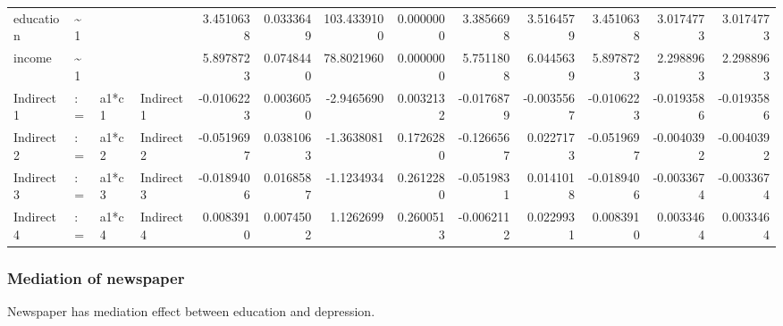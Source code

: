 \documentclass[
]{article}
\begin{document}
\begin{table}[!h]
\begin{tabular}[t]{llllrrrrrrrrr}
\addlinespace
education & \textasciitilde{}1 &  &  & 3.4510638 & 0.0333649 & 103.4339100 & 0.0000000 & 3.3856698 & 3.5164579 & 3.4510638 & 3.0174773 & 3.0174773\\
income & \textasciitilde{}1 &  &  & 5.8978723 & 0.0748440 & 78.8021960 & 0.0000000 & 5.7511808 & 6.0445639 & 5.8978723 & 2.2988963 & 2.2988963\\
Indirect1 & := & a1*c1 & Indirect1 & -0.0106223 & 0.0036050 & -2.9465690 & 0.0032132 & -0.0176879 & -0.0035567 & -0.0106223 & -0.0193586 & -0.0193586\\
Indirect2 & := & a1*c2 & Indirect2 & -0.0519697 & 0.0381063 & -1.3638081 & 0.1726280 & -0.1266567 & 0.0227173 & -0.0519697 & -0.0040392 & -0.0040392\\
Indirect3 & := & a1*c3 & Indirect3 & -0.0189406 & 0.0168587 & -1.1234934 & 0.2612280 & -0.0519831 & 0.0141018 & -0.0189406 & -0.0033674 & -0.0033674\\
\addlinespace
Indirect4 & := & a1*c4 & Indirect4 & 0.0083910 & 0.0074502 & 1.1262699 & 0.2600513 & -0.0062112 & 0.0229931 & 0.0083910 & 0.0033464 & 0.0033464\\
\bottomrule
\end{tabular}
\end{table}

\newpage

\hypertarget{mediation-of-newspaper}{%
\subsubsection{Mediation of newspaper}\label{mediation-of-newspaper}}

Newspaper has mediation effect between education and depression.
\end{document}
